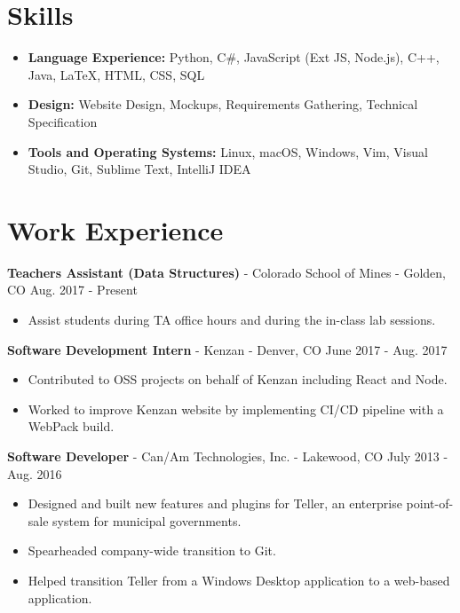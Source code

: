 \documentclass[10.5pt,letterpaper]{article}
\begin{document}
\section*{Skills}
{\renewcommand\labelitemi{}
    \renewcommand\leftmargini{0pt}
    \begin{itemize}
        \item \textbf{Language Experience:} Python, C\#, JavaScript (Ext JS,
            Node.js), C++, Java, \LaTeX, HTML, CSS, SQL
        \item \textbf{Design:} Website Design, Mockups, Requirements Gathering,
            Technical Specification
        \item \textbf{Tools and Operating Systems:} Linux, macOS, Windows, Vim,
            Visual Studio, Git, Sublime Text, IntelliJ IDEA
    \end{itemize}
}

\section*{Work Experience}
\textbf{Teachers Assistant (Data Structures)} - Colorado School of Mines -
Golden, CO \hfill Aug. 2017 - Present
\begin{itemize}
    \item Assist students during TA office hours and during the in-class lab
        sessions.
\end{itemize}


\vspace{4pt}
\textbf{Software Development Intern} - Kenzan - Denver, CO
\hfill June 2017 - Aug. 2017
\begin{itemize}
    \item Contributed to OSS projects on behalf of Kenzan including React and
        Node.
    \item Worked to improve Kenzan website by implementing CI/CD pipeline with
        a WebPack build.
\end{itemize}

\vspace{4pt}
\textbf{Software Developer} - Can/Am Technologies, Inc. - Lakewood, CO
\hfill July 2013 - Aug. 2016
\begin{itemize}
    \item Designed and built new features and plugins for Teller, an enterprise
        point-of-sale system for municipal governments.
    \item Spearheaded company-wide transition to Git.
    \item Helped transition Teller from a Windows Desktop application to a
        web-based application.
\end{itemize}
\end{document}

